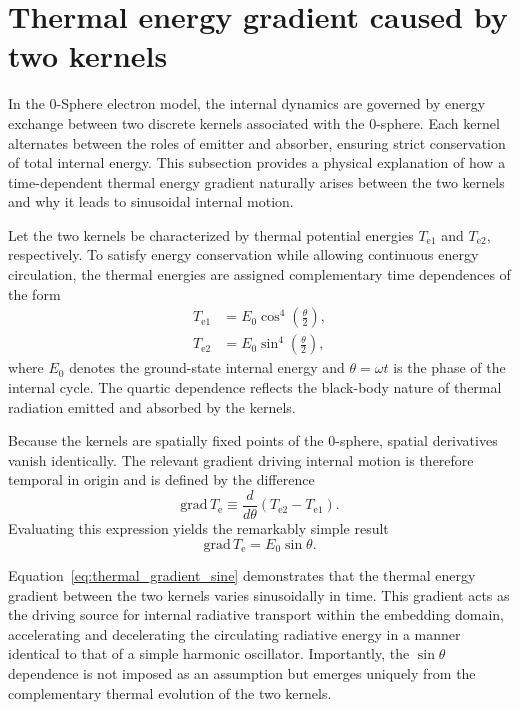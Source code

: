 \documentclass[%
 reprint,
 amsmath,amssymb,
 aps,
 prb,
]{revtex4-2}
\numberwithin{equation}{section}
\begin{document}
\section{Thermal energy gradient caused by two kernels}
\label{sec:thermal_energy_gradient}

In the 0-Sphere electron model, the internal dynamics are governed by energy exchange between two discrete kernels associated with the 0-sphere.
Each kernel alternates between the roles of emitter and absorber, ensuring strict conservation of total internal energy.
This subsection provides a physical explanation of how a time-dependent thermal energy gradient naturally arises between the two kernels and why it leads to sinusoidal internal motion.

Let the two kernels be characterized by thermal potential energies $T_{\mathrm{e1}}$ and $T_{\mathrm{e2}}$, respectively.
To satisfy energy conservation while allowing continuous energy circulation, the thermal energies are assigned complementary time dependences of the form
\begin{equation}
\begin{split}
T_{\mathrm{e1}} &= E_0 \cos^4\!\left(\frac{\theta}{2}\right), \\
T_{\mathrm{e2}} &= E_0 \sin^4\!\left(\frac{\theta}{2}\right),
\end{split}
\label{eq:kernel_temperatures}
\end{equation}
where $E_0$ denotes the ground-state internal energy and $\theta=\omega t$ is the phase of the internal cycle.
The quartic dependence reflects the black-body nature of thermal radiation emitted and absorbed by the kernels.

Because the kernels are spatially fixed points of the 0-sphere, spatial derivatives vanish identically.
The relevant gradient driving internal motion is therefore temporal in origin and is defined by the difference
\begin{equation}
\mathrm{grad}\,T_{\mathrm{e}} \equiv \frac{d}{d\theta}\left(T_{\mathrm{e2}} - T_{\mathrm{e1}}\right).
\end{equation}
Evaluating this expression yields the remarkably simple result
\begin{equation}
\mathrm{grad}\,T_{\mathrm{e}} = E_0 \sin\theta .
\label{eq:thermal_gradient_sine}
\end{equation}

Equation~\eqref{eq:thermal_gradient_sine} demonstrates that the thermal energy gradient between the two kernels varies sinusoidally in time.
This gradient acts as the driving source for internal radiative transport within the embedding domain, accelerating and decelerating the circulating radiative energy in a manner identical to that of a simple harmonic oscillator.
Importantly, the $\sin\theta$ dependence is not imposed as an assumption but emerges uniquely from the complementary thermal evolution of the two kernels.
\end{document}
